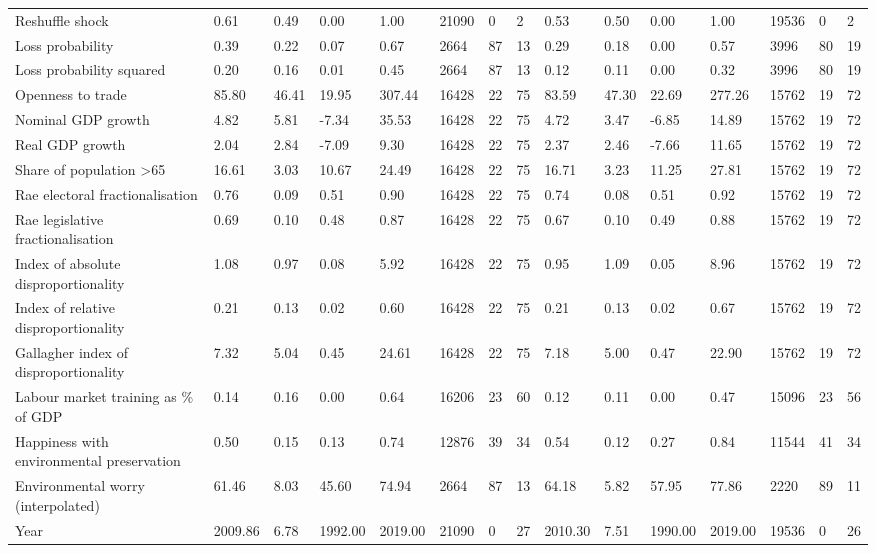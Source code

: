 \begin{longtable}{lllllllllllllll}
Reshuffle shock & 0.61 & 0.49 & 0.00 & 1.00 & 21090 & 0 & 2 & 0.53 & 0.50 & 0.00 & 1.00 & 19536 & 0 & 2\\
Loss probability & 0.39 & 0.22 & 0.07 & 0.67 & 2664 & 87 & 13 & 0.29 & 0.18 & 0.00 & 0.57 & 3996 & 80 & 19\\
\addlinespace
Loss probability squared & 0.20 & 0.16 & 0.01 & 0.45 & 2664 & 87 & 13 & 0.12 & 0.11 & 0.00 & 0.32 & 3996 & 80 & 19\\
Openness to trade & 85.80 & 46.41 & 19.95 & 307.44 & 16428 & 22 & 75 & 83.59 & 47.30 & 22.69 & 277.26 & 15762 & 19 & 72\\
Nominal GDP growth & 4.82 & 5.81 & -7.34 & 35.53 & 16428 & 22 & 75 & 4.72 & 3.47 & -6.85 & 14.89 & 15762 & 19 & 72\\
Real GDP growth & 2.04 & 2.84 & -7.09 & 9.30 & 16428 & 22 & 75 & 2.37 & 2.46 & -7.66 & 11.65 & 15762 & 19 & 72\\
Share of population >65 & 16.61 & 3.03 & 10.67 & 24.49 & 16428 & 22 & 75 & 16.71 & 3.23 & 11.25 & 27.81 & 15762 & 19 & 72\\
\addlinespace
Rae electoral fractionalisation & 0.76 & 0.09 & 0.51 & 0.90 & 16428 & 22 & 75 & 0.74 & 0.08 & 0.51 & 0.92 & 15762 & 19 & 72\\
Rae legislative fractionalisation & 0.69 & 0.10 & 0.48 & 0.87 & 16428 & 22 & 75 & 0.67 & 0.10 & 0.49 & 0.88 & 15762 & 19 & 72\\
Index of absolute disproportionality & 1.08 & 0.97 & 0.08 & 5.92 & 16428 & 22 & 75 & 0.95 & 1.09 & 0.05 & 8.96 & 15762 & 19 & 72\\
Index of relative disproportionality & 0.21 & 0.13 & 0.02 & 0.60 & 16428 & 22 & 75 & 0.21 & 0.13 & 0.02 & 0.67 & 15762 & 19 & 72\\
Gallagher index of disproportionality & 7.32 & 5.04 & 0.45 & 24.61 & 16428 & 22 & 75 & 7.18 & 5.00 & 0.47 & 22.90 & 15762 & 19 & 72\\
\addlinespace
Labour market training as \% of GDP & 0.14 & 0.16 & 0.00 & 0.64 & 16206 & 23 & 60 & 0.12 & 0.11 & 0.00 & 0.47 & 15096 & 23 & 56\\
Happiness with environmental preservation & 0.50 & 0.15 & 0.13 & 0.74 & 12876 & 39 & 34 & 0.54 & 0.12 & 0.27 & 0.84 & 11544 & 41 & 34\\
Environmental worry (interpolated) & 61.46 & 8.03 & 45.60 & 74.94 & 2664 & 87 & 13 & 64.18 & 5.82 & 57.95 & 77.86 & 2220 & 89 & 11\\
Year & 2009.86 & 6.78 & 1992.00 & 2019.00 & 21090 & 0 & 27 & 2010.30 & 7.51 & 1990.00 & 2019.00 & 19536 & 0 & 26\\
\bottomrule
\end{longtable}

